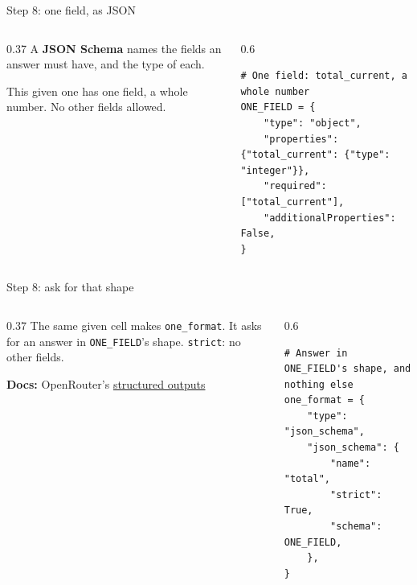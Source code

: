 \documentclass[9pt,aspectratio=169]{beamer}
\begin{document}
\begin{frame}[fragile]{Step 8: one field, as JSON}
    \begin{columns}[T]
        \begin{column}{0.37\textwidth}
            A \textbf{JSON Schema} names the fields an answer must have, and the type of each.

            \medskip
            This given one has one field, a whole number. No other fields allowed.
        \end{column}
        \begin{column}{0.6\textwidth}
\begin{lstlisting}
# One field: total_current, a whole number
ONE_FIELD = {
    "type": "object",
    "properties": {"total_current": {"type": "integer"}},
    "required": ["total_current"],
    "additionalProperties": False,
}
\end{lstlisting}
        \end{column}
    \end{columns}
\end{frame}

\begin{frame}[fragile]{Step 8: ask for that shape}
    \begin{columns}[T]
        \begin{column}{0.37\textwidth}
            The same given cell makes \texttt{one\_format}. It asks for an answer in \texttt{ONE\_FIELD}'s shape. \texttt{strict}: no other fields.

            \medskip
            {\scriptsize\textbf{Docs:} OpenRouter's \href{https://openrouter.ai/docs/guides/features/structured-outputs}{structured outputs}\par}
        \end{column}
        \begin{column}{0.6\textwidth}
\begin{lstlisting}
# Answer in ONE_FIELD's shape, and nothing else
one_format = {
    "type": "json_schema",
    "json_schema": {
        "name": "total",
        "strict": True,
        "schema": ONE_FIELD,
    },
}
\end{lstlisting}
        \end{column}
    \end{columns}
\end{frame}
\end{document}
